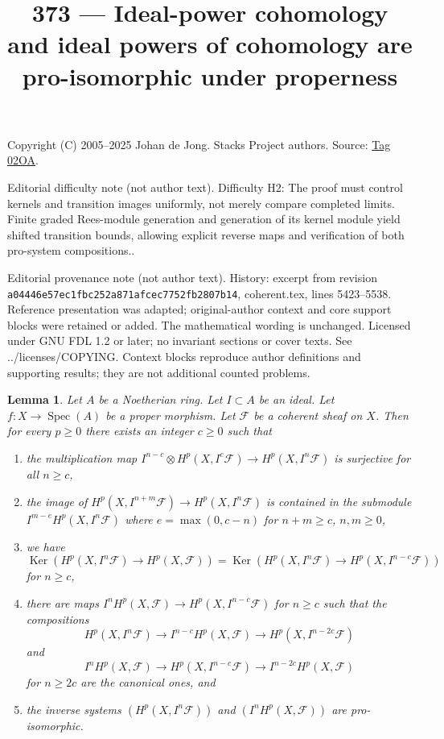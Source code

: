 \documentclass{amsart}
\theoremstyle{plain}
\newtheorem{lemma}[subsection]{Lemma}
\theoremstyle{definition}
\theoremstyle{remark}
\numberwithin{equation}{subsection}
\def\Spec{\mathop{\mathrm{Spec}}}
\def\Ker{\mathop{\mathrm{Ker}}}
\begin{document}
\title[Stacks Project, Tag 02OA]{373 --- Ideal-power cohomology and ideal powers of cohomology are pro-isomorphic under properness}
\maketitle
\noindent Copyright (C) 2005--2025 Johan de Jong. Stacks Project authors. Source: \href{https://stacks.math.columbia.edu/tag/02OA}{Tag 02OA}.

\noindent Editorial difficulty note (not author text). Difficulty H2: The proof must control kernels and transition images uniformly, not merely compare completed limits. Finite graded Rees-module generation and generation of its kernel module yield shifted transition bounds, allowing explicit reverse maps and verification of both pro-system compositions..

\noindent Editorial provenance note (not author text). History: excerpt from revision \texttt{a0444\allowbreak 6e57e\allowbreak c1fbc\allowbreak 252a8\allowbreak 71afc\allowbreak ec775\allowbreak 2fb28\allowbreak 07b14}, coherent.tex, lines 5423--5538. Reference presentation was adapted; original-author context and core support blocks were retained or added. The mathematical wording is unchanged. Licensed under GNU FDL 1.2 or later; no invariant sections or cover texts. See ../licenses/COPYING. Context blocks reproduce author definitions and supporting results; they are not additional counted problems.

\begin{lemma}
\label{lemma-cohomology-powers-ideal-application}
Let $A$ be a Noetherian ring.
Let $I \subset A$ be an ideal.
Let $f : X \to \Spec(A)$ be a proper morphism.
Let $\mathcal{F}$ be a coherent sheaf on $X$.
Then for every $p \geq 0$ there exists an integer $c \geq 0$
such that
\begin{enumerate}
\item the multiplication map
$I^{n - c} \otimes H^p(X, I^c\mathcal{F}) \to H^p(X, I^n\mathcal{F})$
is surjective for all $n \geq c$,
\item the image of $H^p(X, I^{n + m}\mathcal{F}) \to H^p(X, I^n\mathcal{F})$
is contained in the submodule $I^{m - e} H^p(X, I^n\mathcal{F})$
where $e = \max(0, c - n)$ for $n + m \geq c$, $n, m \geq 0$,
\item we have
$$
\Ker(H^p(X, I^n\mathcal{F}) \to H^p(X, \mathcal{F})) =
\Ker(H^p(X, I^n\mathcal{F}) \to H^p(X, I^{n - c}\mathcal{F}))
$$
for $n \geq c$,
\item there are maps $I^nH^p(X, \mathcal{F}) \to H^p(X, I^{n - c}\mathcal{F})$
for $n \geq c$ such that the compositions
$$
H^p(X, I^n\mathcal{F}) \to 
I^{n - c}H^p(X, \mathcal{F}) \to
H^p(X, I^{n - 2c}\mathcal{F})
$$
and
$$
I^nH^p(X, \mathcal{F}) \to
H^p(X, I^{n - c}\mathcal{F}) \to
I^{n - 2c}H^p(X, \mathcal{F})
$$
for $n \geq 2c$ are the canonical ones, and
\item the inverse systems $(H^p(X, I^n\mathcal{F}))$ and
$(I^nH^p(X, \mathcal{F}))$ are pro-isomorphic.
\end{enumerate}
\end{lemma}
\end{document}
